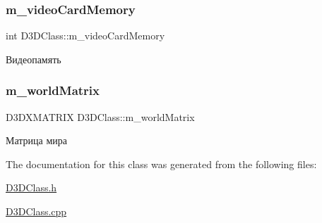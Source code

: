 \subsubsection{\texorpdfstring{m\+\_\+video\+Card\+Memory}{m\_videoCardMemory}}
{\footnotesize\ttfamily int D3\+D\+Class\+::m\+\_\+video\+Card\+Memory\hspace{0.3cm}{\ttfamily [private]}}



Видеопамять 

\mbox{\label{class_d3_d_class_a3b96f1d257d67248da848290bba52db7}} 
\subsubsection{\texorpdfstring{m\+\_\+world\+Matrix}{m\_worldMatrix}}
{\footnotesize\ttfamily D3\+D\+X\+M\+A\+T\+R\+IX D3\+D\+Class\+::m\+\_\+world\+Matrix\hspace{0.3cm}{\ttfamily [private]}}



Матрица мира 



The documentation for this class was generated from the following files\+:\begin{DoxyCompactItemize}
\item 
\hyperlink{_d3_d_class_8h}{D3\+D\+Class.\+h}\item 
\hyperlink{_d3_d_class_8cpp}{D3\+D\+Class.\+cpp}\end{DoxyCompactItemize}

